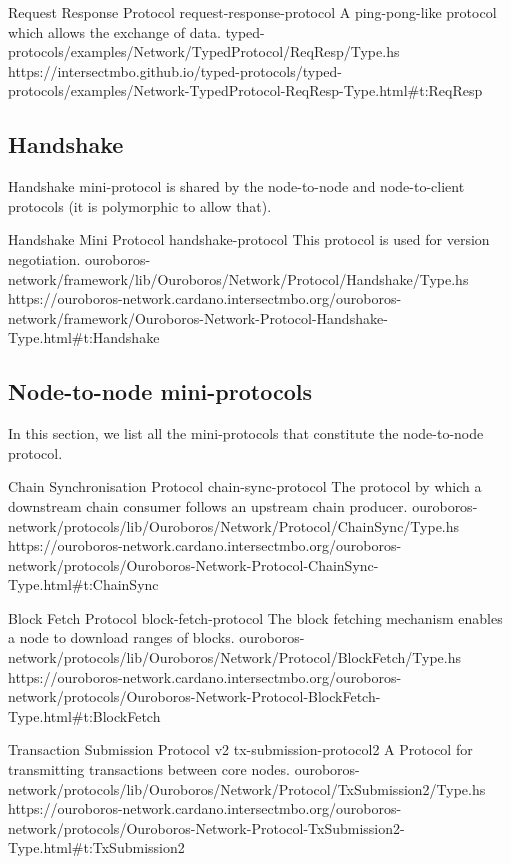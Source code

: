 \miniEntry
    {Request Response Protocol}
    {request-response-protocol}
    {A ping-pong-like protocol which allows the exchange of data.}
    {typed-protocols/examples/Network/TypedProtocol/ReqResp/Type.hs}
    {https://intersectmbo.github.io/typed-protocols/typed-protocols/examples/Network-TypedProtocol-ReqResp-Type.html\#t:ReqResp}

\subsection{Handshake}

Handshake mini-protocol is shared by the node-to-node and node-to-client
protocols (it is polymorphic to allow that).

\miniEntry
    {Handshake Mini Protocol}
    {handshake-protocol}
    {This protocol is used for version negotiation.}
    {ouroboros-network/framework/lib/Ouroboros/Network/Protocol/Handshake/Type.hs}
    {https://ouroboros-network.cardano.intersectmbo.org/ouroboros-network/framework/Ouroboros-Network-Protocol-Handshake-Type.html\#t:Handshake}

\subsection{Node-to-node mini-protocols}

In this section, we list all the mini-protocols that constitute the node-to-node protocol.

\miniEntry
    {Chain Synchronisation Protocol}
    {chain-sync-protocol}
    {The protocol by which a downstream chain consumer follows an upstream chain producer.}
    {ouroboros-network/protocols/lib/Ouroboros/Network/Protocol/ChainSync/Type.hs}
    {https://ouroboros-network.cardano.intersectmbo.org/ouroboros-network/protocols/Ouroboros-Network-Protocol-ChainSync-Type.html\#t:ChainSync}

\miniEntry
    {Block Fetch Protocol}
    {block-fetch-protocol}
    {The block fetching mechanism enables a node to download ranges of blocks.}
    {ouroboros-network/protocols/lib/Ouroboros/Network/Protocol/BlockFetch/Type.hs}
    {https://ouroboros-network.cardano.intersectmbo.org/ouroboros-network/protocols/Ouroboros-Network-Protocol-BlockFetch-Type.html\#t:BlockFetch}

\miniEntry
    {Transaction Submission Protocol v2}
    {tx-submission-protocol2}
    {A Protocol for transmitting transactions between core nodes.}
    {ouroboros-network/protocols/lib/Ouroboros/Network/Protocol/TxSubmission2/Type.hs}
    {https://ouroboros-network.cardano.intersectmbo.org/ouroboros-network/protocols/Ouroboros-Network-Protocol-TxSubmission2-Type.html\#t:TxSubmission2}

